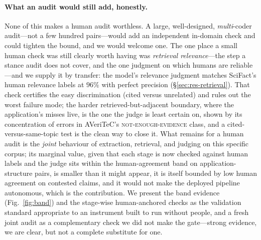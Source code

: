 \paragraph{What an audit would still add, honestly.} None of this makes a human audit worthless. A large,
well-designed, \emph{multi}-coder audit---not a few hundred pairs---would add an independent in-domain
check and could tighten the bound, and we would welcome one. The one place a small human check was still
clearly worth having was \emph{retrieval relevance}---the step a stance audit does not cover, and the one
judgment on which humans are reliable---and we supply it by transfer:
the model's relevance judgment matches SciFact's human relevance labels at $96\%$ with perfect precision
(\S\ref{sec:res-retrieval}). That check certifies the easy discrimination (cited versus unrelated) and
rules out the worst failure mode; the harder retrieved-but-adjacent boundary, where the application's
misses live, is the one the judge is least certain on, shown by its concentration of errors in AVeriTeC's
\textsc{not-enough-evidence} class, and a cited-versus-same-topic test is the clean way to close it. What
remains for a human audit is
the \emph{joint} behaviour of extraction, retrieval, and judging on this specific corpus; its marginal
value, given that each stage is now checked against human labels and the judge sits within the
human-agreement band on application-structure pairs, is smaller than it might appear, it is
itself bounded by low human agreement on contested claims, and it would not make the deployed pipeline
autonomous, which is the contribution. We present the band evidence (Fig.~\ref{fig:band}) and the
stage-wise human-anchored checks as the validation standard appropriate to an instrument built to run
without people, and a fresh joint audit as a complementary check we did not make the gate---strong
evidence, we are clear, but not a complete substitute for one.


